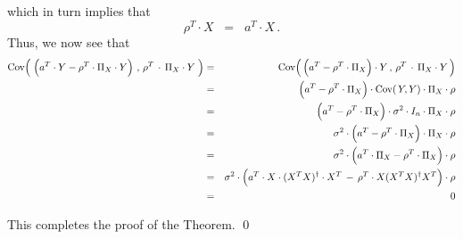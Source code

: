 \begin{enumerate}
	which in turn implies that
	\begin{equation*}
	\rho^{T} \cdot X
	\;\; = \;\;
		a^{T} \cdot X\,.
	\end{equation*}
	Thus, we now see that
	\begin{eqnarray*}
	\Cov\!\left(\;
		\left(a^{T} \cdot Y
		\overset{{\color{white}.}}{-}
		\rho^{T} \cdot \Pi_{X} \cdot Y\right)
		\,,\,
		\rho^{T} \overset{{\color{white}+}}{\cdot} \Pi_{X} \cdot Y
		\;\right)
	&=&
		\Cov\!\left(\,
			\left(a^{T} \overset{{\color{white}.}}{-} \rho^{T} \cdot \Pi_{X} \right) \cdot Y
			\,,\,
			\rho^{T} \overset{{\color{white}+}}{\cdot} \Pi_{X} \cdot Y
			\,\right)
	\\
	&=&
		\left(a^{T} \overset{{\color{white}.}}{-} \rho^{T} \cdot \Pi_{X} \right)
		\cdot \Cov\!\left(\,Y,Y\right) \cdot \Pi_{X} \cdot \rho
	\\
	&=&
		\left(a^{T} \overset{{\color{white}.}}{-} \rho^{T} \cdot \Pi_{X} \right)
		\cdot \sigma^{2} \cdot I_{n} \cdot \Pi_{X} \cdot \rho
	\\
	&=&
		\sigma^{2}
		\cdot
		\left(a^{T} \overset{{\color{white}.}}{-} \rho^{T} \cdot \Pi_{X} \right)
		\cdot \Pi_{X} \cdot \rho
	\\
	&=&
		\sigma^{2}
		\cdot
		\left(a^{T} \cdot \Pi_{X} \overset{{\color{white}.}}{-} \rho^{T} \cdot \Pi_{X} \right)
		\cdot \rho
	\\
	&=&
		\sigma^{2}
		\cdot
		\left(a^{T} \cdot X\cdot(X^{T}X)^{\dagger}\cdot X^{T}
		\,\overset{{\color{white}.}}{-}\,
		\rho^{T} \cdot X(X^{T}X)^{\dagger}X^{T} \right)
		\cdot \rho
	\\
	&=&
		0
	\end{eqnarray*}
\end{enumerate}
This completes the proof of the Theorem.
\qed


